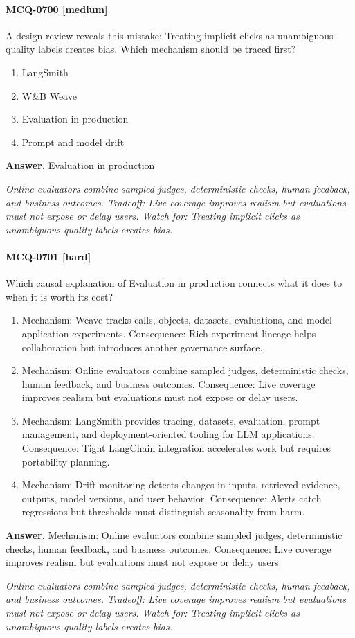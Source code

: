 \paragraph{MCQ-0700 [medium]} A design review reveals this mistake: Treating implicit clicks as unambiguous quality labels creates bias. Which mechanism should be traced first?
\begin{enumerate}[label=\Alph*.]
\item LangSmith
\item W\&B Weave
\item Evaluation in production
\item Prompt and model drift
\end{enumerate}
\noindent\textbf{Answer.} Evaluation in production
\par\textit{Online evaluators combine sampled judges, deterministic checks, human feedback, and business outcomes. Tradeoff: Live coverage improves realism but evaluations must not expose or delay users. Watch for: Treating implicit clicks as unambiguous quality labels creates bias.}
\paragraph{MCQ-0701 [hard]} Which causal explanation of Evaluation in production connects what it does to when it is worth its cost?
\begin{enumerate}[label=\Alph*.]
\item Mechanism: Weave tracks calls, objects, datasets, evaluations, and model application experiments. Consequence: Rich experiment lineage helps collaboration but introduces another governance surface.
\item Mechanism: Online evaluators combine sampled judges, deterministic checks, human feedback, and business outcomes. Consequence: Live coverage improves realism but evaluations must not expose or delay users.
\item Mechanism: LangSmith provides tracing, datasets, evaluation, prompt management, and deployment-oriented tooling for LLM applications. Consequence: Tight LangChain integration accelerates work but requires portability planning.
\item Mechanism: Drift monitoring detects changes in inputs, retrieved evidence, outputs, model versions, and user behavior. Consequence: Alerts catch regressions but thresholds must distinguish seasonality from harm.
\end{enumerate}
\noindent\textbf{Answer.} Mechanism: Online evaluators combine sampled judges, deterministic checks, human feedback, and business outcomes. Consequence: Live coverage improves realism but evaluations must not expose or delay users.
\par\textit{Online evaluators combine sampled judges, deterministic checks, human feedback, and business outcomes. Tradeoff: Live coverage improves realism but evaluations must not expose or delay users. Watch for: Treating implicit clicks as unambiguous quality labels creates bias.}

